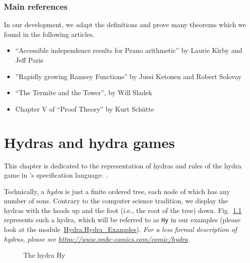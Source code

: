 \subsection*{Main references}

In our development, we adapt the definitions and prove many theorems which
we found in the following articles. 
\begin{itemize}
\item ``Accessible independence results for Peano arithmetic''  by Laurie Kirby and Jeff Paris~\cite{KP82}
\item ''Rapidly growing Ramsey Functions'' by Jussi Ketonen and Robert Solovay~\cite{KS81}
\item ``The Termite and the Tower'', by Will Sladek~\cite{Sladek07thetermite}
\item Chapter V of ``Proof Theory'' by Kurt Schütte~\cite{schutte}
\end{itemize}






\chapter{Hydras and hydra games}

\label{sec:orgheadline91}





This chapter is dedicated to the representation of hydras and rules of the hydra game in \coq's specification language:~\gallina. 


Technically, a \emph{hydra} is just a finite ordered tree, each node of which 
has any number of sons. Contrary to the computer science tradition, we display the hydras 
with the heads up and the foot (i.e., the root of the tree) down.
Fig.~\ref{fig:Hy} represents such  a hydra, which will be referred to as \texttt{Hy} in our examples (please look at the 
module~\href{../theories/html/hydras.Hydra.Hydra_Examples.html}{Hydra.Hydra\_Examples}). 
\emph{For a less formal description of hydras, please see 
\url{https://www.smbc-comics.com/comic/hydra}.}

\begin{figure}[h]
\centering
{}
\caption{The hydra Hy \label{fig:Hy}}
\end{figure}



